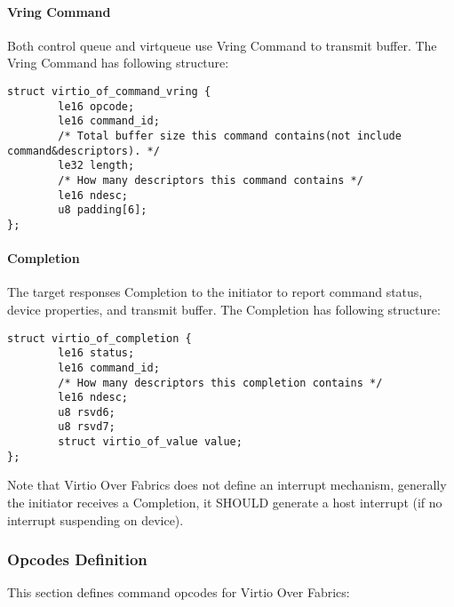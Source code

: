 \paragraph{Vring Command}\label{sec:Virtio Transport Options / Virtio Over Fabrics / Transmission Protocol / Commands Definition / Vring Command}

Both control queue and virtqueue use Vring Command to transmit buffer.
The Vring Command has following structure:

\begin{lstlisting}
struct virtio_of_command_vring {
        le16 opcode;
        le16 command_id;
        /* Total buffer size this command contains(not include command&descriptors). */
        le32 length;
        /* How many descriptors this command contains */
        le16 ndesc;
        u8 padding[6];
};
\end{lstlisting}

\paragraph{Completion}\label{sec:Virtio Transport Options / Virtio Over Fabrics / Transmission Protocol / Commands Definition / Completion}

The target responses Completion to the initiator to report command status,
device properties, and transmit buffer. The Completion has following structure:

\begin{lstlisting}
struct virtio_of_completion {
        le16 status;
        le16 command_id;
        /* How many descriptors this completion contains */
        le16 ndesc;
        u8 rsvd6;
        u8 rsvd7;
        struct virtio_of_value value;
};
\end{lstlisting}

Note that Virtio Over Fabrics does not define an interrupt mechanism, generally
the initiator receives a Completion, it SHOULD generate a host interrupt
(if no interrupt suspending on device).

\subsubsection{Opcodes Definition}\label{sec:Virtio Transport Options / Virtio Over Fabrics / Transmission Protocol / Opcodes Definition}
This section defines command opcodes for Virtio Over Fabrics:

